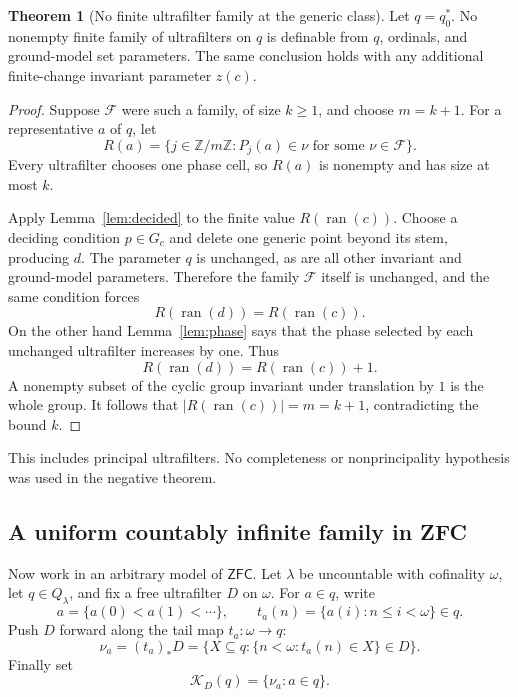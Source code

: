 \documentclass[11pt,letterpaper]{article}
\theoremstyle{definition}
\newtheorem{theorem}[definition]{Theorem}
\numberwithin{equation}{section}
\newcommand{\ZFC}{\mathsf{ZFC}}
\begin{document}
\begin{theorem}[No finite ultrafilter family at the generic class]\label{thm:finiteultra}
Let $q=q_0^*$. No nonempty finite family of ultrafilters on $q$ is definable from $q$, ordinals, and ground-model set parameters. The same conclusion holds with any additional finite-change invariant parameter $z(c)$.
\end{theorem}
\begin{proof}
Suppose $\mathcal F$ were such a family, of size $k\ge1$, and choose $m=k+1$. For a representative $a$ of $q$, let
\[
 R(a)=\{j\in\mathbb Z/m\mathbb Z:
                 P_j(a)\in\nu\text{ for some }\nu\in\mathcal F\}.
\]
Every ultrafilter chooses one phase cell, so $R(a)$ is nonempty and has size at most $k$.

Apply Lemma~\ref{lem:decided} to the finite value $R(\operatorname{ran}(c))$. Choose a deciding condition $p\in G_c$ and delete one generic point beyond its stem, producing $d$. The parameter $q$ is unchanged, as are all other invariant and ground-model parameters. Therefore the family $\mathcal F$ itself is unchanged, and the same condition forces
\[
 R(\operatorname{ran}(d))=R(\operatorname{ran}(c)).
\]
On the other hand Lemma~\ref{lem:phase} says that the phase selected by each unchanged ultrafilter increases by one. Thus
\[
 R(\operatorname{ran}(d))=R(\operatorname{ran}(c))+1.
\]
A nonempty subset of the cyclic group invariant under translation by $1$ is the whole group. It follows that $|R(\operatorname{ran}(c))|=m=k+1$, contradicting the bound $k$.
\end{proof}

This includes principal ultrafilters. No completeness or nonprincipality hypothesis was used in the negative theorem.

\subsection{A uniform countably infinite family in ZFC}

Now work in an arbitrary model of $\ZFC$. Let $\lambda$ be uncountable with cofinality $\omega$, let $q\in Q_\lambda$, and fix a free ultrafilter $D$ on $\omega$. For $a\in q$, write
\[
 a=\{a(0)<a(1)<\cdots\},\qquad
 t_a(n)=\{a(i):n\le i<\omega\}\in q.
\]
Push $D$ forward along the tail map $t_a:\omega\to q$:
\begin{equation}\label{eq:tailpush}
 \nu_a=(t_a)_*D
       =\{X\subseteq q:\{n<\omega:t_a(n)\in X\}\in D\}.
\end{equation}
Finally set
\begin{equation}\label{eq:cloud}
 \mathcal K_D(q)=\{\nu_a:a\in q\}.
\end{equation}
\end{document}
